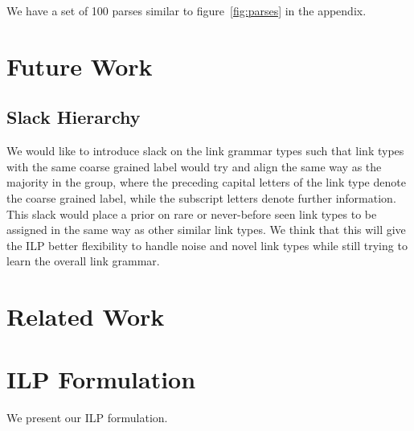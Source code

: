 \documentclass[11pt]{article}
\begin{document}
We have a set of 100 parses similar to figure~\ref{fig:parses} in the appendix.


\section{Future Work}

\subsection{Slack Hierarchy}
We would like to introduce slack on the link grammar types such that link types with the same coarse grained label would try and align the same way as the majority in the group, where the preceding capital letters of the link type denote the coarse grained label, while the subscript letters denote further information. This slack would place a prior on rare or never-before seen link types to be assigned in the same way as other similar link types. We think that this will give the ILP better flexibility to handle noise and novel link types while still trying to learn the overall link grammar.





\section{Related Work}










\clearpage
\appendix
\section{ILP Formulation}
We present our ILP formulation. 
\end{document}
